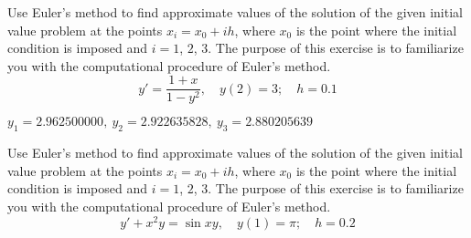 \documentclass{ximera}
\begin{document}
\begin{problem}\label{exer:3.1.4} Use Euler's method to find approximate values of the solution of the given initial value problem
at the points $x_i=x_0+ih$, where $x_0$ is the point where the
initial condition is imposed and $i=1$, $2$, $3$. The purpose of this exercise is to familiarize you with the computational procedure of Euler's method.
$$y'=\frac{1+x}{1-y^2},\quad y(2)=3;\quad h=0.1$$



\begin{solution}
    $y_1=2.962500000,\ y_2=2.922635828,\ y_3=2.880205639$
\end{solution}
\end{problem}

\begin{problem}\label{exer:3.1.5} Use Euler's method to find approximate values of the solution of the given initial value problem
at the points $x_i=x_0+ih$, where $x_0$ is the point where the
initial condition is imposed and $i=1$, $2$, $3$. The purpose of this exercise is to familiarize you with the computational procedure of Euler's method.
$$y'+x^2y=\sin xy,\quad y(1)=\pi;\quad h=0.2$$
\end{problem}
\end{document}

